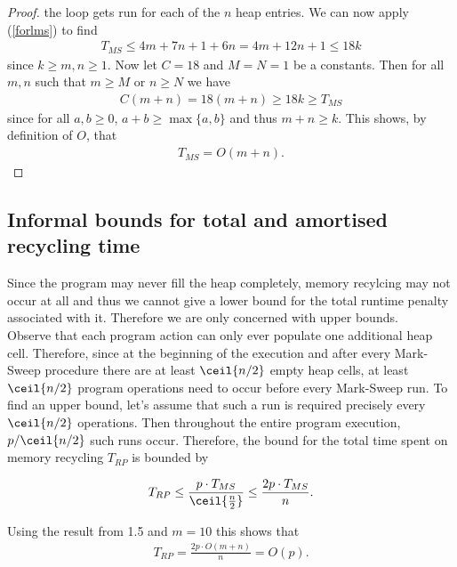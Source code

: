 \documentclass{article}
\begin{document}
\begin{proof}
    the loop gets run for each of the $n$ heap entries. We can now apply (\ref{forlms})
    to find
    \begin{align}
        \label{tmsbound}
        T_{MS} \leq 4m + 7n + 1 + 6n = 4m + 12n + 1 \leq 18k
    \end{align}
    since $k\geq m,n \geq 1$. Now let $C=18$ and $M=N=1$ be a constants. 
    Then for all $m,n$ such that $m\geq M$ or $n\geq N$ we have
    \begin{align*}
        C(m+n) = 18(m+n) \geq 18k \geq T_{MS}
    \end{align*}
    since for all $a,b\geq 0$, $a+b \geq \max\{a,b\}$ and thus $m+n\geq k$.
    This shows, by definition of $O$, that
    \begin{align}
        \label{tmsbound}
        T_{MS} = O(m+n).
    \end{align}
\end{proof}

\subsection{Informal bounds for total and amortised recycling time}

Since the program may never fill the heap completely, memory recylcing may not occur
at all and thus we cannot give a lower bound for the total runtime penalty associated
with it. Therefore we are only concerned with upper bounds.\\
Observe that each program action can only ever populate one additional heap cell.
Therefore, since at the beginning of the execution and after every Mark-Sweep
procedure there are at least $\ceil{n/2}$ empty heap cells, at least $\ceil{n/2}$ program operations
need to occur before every Mark-Sweep run. To find an upper bound, let's assume that
such a run is required precisely every $\ceil{n/2}$ operations. Then throughout the
entire program execution, $p/\ceil{n/2}$ such runs occur. Therefore, the bound
for the total time spent on memory recycling $T_{RP}$ is bounded by 

\begin{align*}
    T_{RP} \leq \frac{p\cdot T_{MS}}{\ceil{\frac{n}{2}}} \leq \frac{2p\cdot T_{MS}}{n}.
\end{align*}

Using the result from 1.5 and $m=10$ this shows that
\begin{align*}
    T_{RP} = \frac{2p\cdot O(m+n)}{n} = O(p).
\end{align*}
\end{document}
